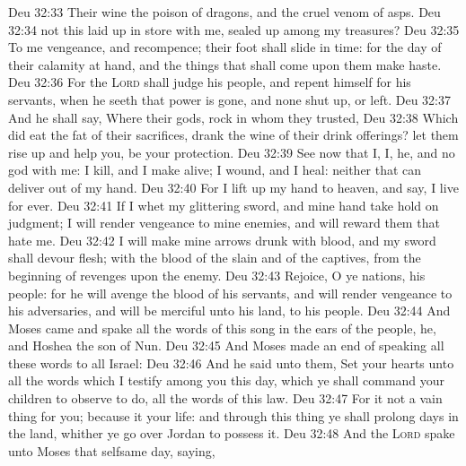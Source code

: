\vs Deu 32:33 Their wine  the poison of dragons, and the cruel venom of asps.
\vs Deu 32:34  not this laid up in store with me,  sealed up among my treasures?
\vs Deu 32:35 To me  vengeance, and recompence; their foot shall slide in  time: for the day of their calamity  at hand, and the things that shall come upon them make haste.
\vs Deu 32:36 For the \textsc{Lord} shall judge his people, and repent himself for his servants, when he seeth that  power is gone, and  none shut up, or left.
\vs Deu 32:37 And he shall say, Where  their gods,  rock in whom they trusted,
\vs Deu 32:38 Which did eat the fat of their sacrifices,  drank the wine of their drink offerings? let them rise up and help you,  be your protection.
\vs Deu 32:39 See now that I,  I,  he, and  no god with me: I kill, and I make alive; I wound, and I heal: neither  that can deliver out of my hand.
\vs Deu 32:40 For I lift up my hand to heaven, and say, I live for ever.
\vs Deu 32:41 If I whet my glittering sword, and mine hand take hold on judgment; I will render vengeance to mine enemies, and will reward them that hate me.
\vs Deu 32:42 I will make mine arrows drunk with blood, and my sword shall devour flesh;  with the blood of the slain and of the captives, from the beginning of revenges upon the enemy.
\vs Deu 32:43 Rejoice, O ye nations,  his people: for he will avenge the blood of his servants, and will render vengeance to his adversaries, and will be merciful unto his land,  to his people.
\vs Deu 32:44 And Moses came and spake all the words of this song in the ears of the people, he, and Hoshea the son of Nun.
\vs Deu 32:45 And Moses made an end of speaking all these words to all Israel:
\vs Deu 32:46 And he said unto them, Set your hearts unto all the words which I testify among you this day, which ye shall command your children to observe to do, all the words of this law.
\vs Deu 32:47 For it  not a vain thing for you; because it  your life: and through this thing ye shall prolong  days in the land, whither ye go over Jordan to possess it.
\vs Deu 32:48 And the \textsc{Lord} spake unto Moses that selfsame day, saying,
